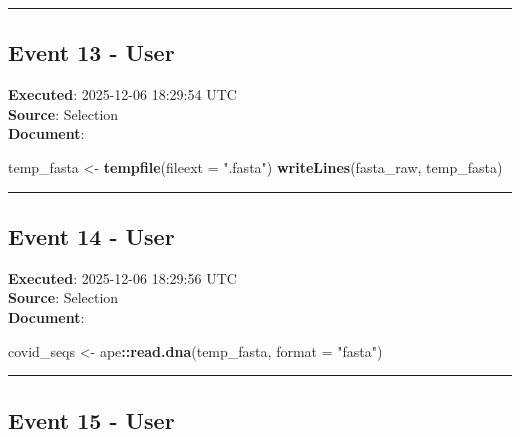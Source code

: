 \documentclass[
  11pt,
]{article}
\newenvironment{Shaded}{\begin{snugshade}}{\end{snugshade}}
\newcommand{\AttributeTok}[1]{\textcolor[rgb]{0.13,0.29,0.53}{#1}}
\newcommand{\FunctionTok}[1]{\textcolor[rgb]{0.13,0.29,0.53}{\textbf{#1}}}
\newcommand{\NormalTok}[1]{#1}
\newcommand{\OtherTok}[1]{\textcolor[rgb]{0.56,0.35,0.01}{#1}}
\newcommand{\SpecialCharTok}[1]{\textcolor[rgb]{0.81,0.36,0.00}{\textbf{#1}}}
\newcommand{\StringTok}[1]{\textcolor[rgb]{0.31,0.60,0.02}{#1}}
\begin{document}
\begin{center}\rule{0.5\linewidth}{0.5pt}\end{center}

\subsection{Event 13 - User}\label{event-13---user}

\textbf{Executed}: 2025-12-06 18:29:54 UTC\\
\textbf{Source}: Selection\\
\textbf{Document}:

\begin{Shaded}
\begin{Highlighting}[]
\NormalTok{temp\_fasta }\OtherTok{\textless{}{-}} \FunctionTok{tempfile}\NormalTok{(}\AttributeTok{fileext =} \StringTok{".fasta"}\NormalTok{)}
\FunctionTok{writeLines}\NormalTok{(fasta\_raw, temp\_fasta)}
\end{Highlighting}
\end{Shaded}

\begin{center}\rule{0.5\linewidth}{0.5pt}\end{center}

\subsection{Event 14 - User}\label{event-14---user}

\textbf{Executed}: 2025-12-06 18:29:56 UTC\\
\textbf{Source}: Selection\\
\textbf{Document}:

\begin{Shaded}
\begin{Highlighting}[]
\NormalTok{covid\_seqs }\OtherTok{\textless{}{-}}\NormalTok{ ape}\SpecialCharTok{::}\FunctionTok{read.dna}\NormalTok{(temp\_fasta, }\AttributeTok{format =} \StringTok{"fasta"}\NormalTok{)}
\end{Highlighting}
\end{Shaded}

\begin{center}\rule{0.5\linewidth}{0.5pt}\end{center}

\subsection{Event 15 - User}\label{event-15---user}
\end{document}
